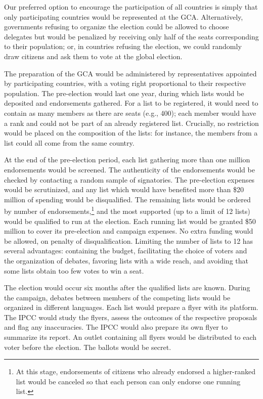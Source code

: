 \documentclass[12pt,english]{article}
\begin{document}
Our preferred option to encourage the participation of all countries is simply that only participating countries would be represented at the GCA. Alternatively,  governments refusing to organize the election could be allowed to choose delegates but would be penalized by receiving only half of the seats corresponding to their population; or, in countries refusing the election, we could randomly draw citizens and ask them to vote at the global election. 

The preparation of the GCA would be administered by representatives appointed by participating countries, with a voting right proportional to their respective population. The pre-election would last one year, during which lists would be deposited and endorsements gathered. For a list to be registered, it would need to contain as many members as there are seats (e.g., 400); each member would have a rank and could not be part of an already registered list. Crucially, no restriction would be placed on the composition of the lists: for instance, the members from a list could all come from the same country. %

At the end of the pre-election period, each list gathering more than one million endorsements would be screened. The authenticity of the endorsements would be checked by contacting a random sample of signatories. The pre-election expenses would be scrutinized, and any list which would have benefited more than \$20 million of spending would be disqualified. The remaining lists would be ordered by number of endorsements,\footnote{At this stage, endorsements of citizens who already endorsed a higher-ranked list would be canceled so that each person can only endorse one running list.
} and the most supported (up to a limit of 12 lists) would be qualified to run at the election. Each running list would be granted \$50 million to cover its pre-election and campaign expenses. No extra funding would be allowed, on penalty of disqualification. Limiting the number of lists to 12 has several advantages: containing the budget, facilitating the choice of voters and the organization of debates, favoring lists with a wide reach, and avoiding that some lists obtain too few votes to win a seat. 

The election would occur six months after the qualified lists are known. During the campaign, debates between members of the competing lists would be organized in different languages. Each list would prepare a flyer with its platform. The IPCC would study the flyers, assess the outcomes of the respective proposals and flag any inaccuracies. The IPCC would also prepare its own flyer to summarize its report. An outlet containing all flyers would be distributed to each voter before the election. The ballots would be secret. 
\end{document}
